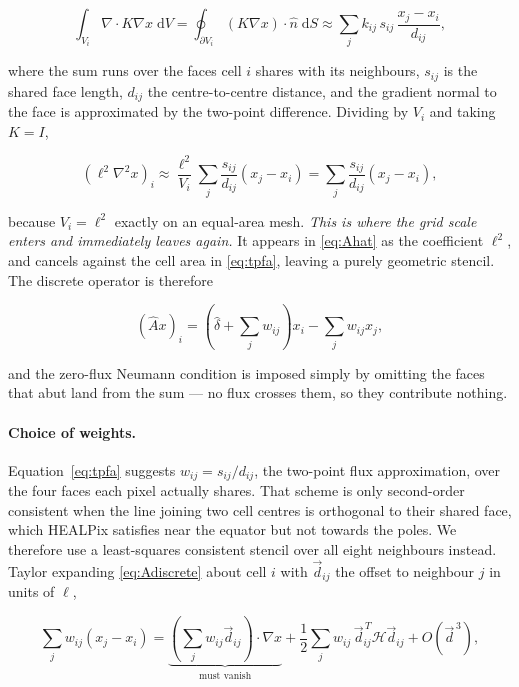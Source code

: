 \documentclass[11pt]{article}
\newcommand{\grid}{\ell}
\newcommand{\dhat}{\hat{\delta}}
\newcommand{\Ahat}{\hat{A}}
\begin{document}
\begin{equation}
\label{eq:fv}
\int_{V_i} \nabla\cdot K\nabla x \; \mathrm{d}V
 = \oint_{\partial V_i} \left(K\nabla x\right)\cdot \hat{n} \; \mathrm{d}S
 \approx \sum_{j} k_{ij}\, s_{ij} \, \frac{x_j - x_i}{d_{ij}},
\end{equation}

where the sum runs over the faces cell $i$ shares with its neighbours, $s_{ij}$ is the
shared face length, $d_{ij}$ the centre-to-centre distance, and the gradient normal to
the face is approximated by the two-point difference. Dividing by $V_i$ and taking
$K = I$,

\begin{equation}
\label{eq:tpfa}
\left(\grid^2 \nabla^2 x\right)_i
 \approx \frac{\grid^2}{V_i}\sum_j \frac{s_{ij}}{d_{ij}}\left(x_j - x_i\right)
 = \sum_j \frac{s_{ij}}{d_{ij}}\left(x_j - x_i\right),
\end{equation}

\noindent because $V_i = \grid^2$ exactly on an equal-area mesh. \emph{This is where the
grid scale enters and immediately leaves again.} It appears in \eqref{eq:Ahat} as the
coefficient $\grid^2$, and cancels against the cell area in \eqref{eq:tpfa}, leaving a
purely geometric stencil. The discrete operator is therefore

\begin{equation}
\label{eq:Adiscrete}
\left(\Ahat{}x\right)_i
 = \left(\dhat + \sum_j w_{ij}\right) x_i - \sum_j w_{ij} x_j ,
\end{equation}

and the zero-flux Neumann condition is imposed simply by omitting the faces that abut
land from the sum --- no flux crosses them, so they contribute nothing.

\paragraph{Choice of weights.} Equation~\eqref{eq:tpfa} suggests $w_{ij} = s_{ij}/d_{ij}$,
the two-point flux approximation, over the four faces each pixel actually shares. That
scheme is only second-order consistent when the line joining two cell centres is
orthogonal to their shared face, which HEALPix satisfies near the equator but not towards
the poles. We therefore use a least-squares consistent stencil over all eight neighbours
instead. Taylor expanding \eqref{eq:Adiscrete} about cell $i$ with
$\vec{d}_{ij}$ the offset to neighbour $j$ in units of $\grid$,

\begin{equation}
\sum_j w_{ij}\left(x_j - x_i\right)
 = \underbrace{\left(\sum_j w_{ij}\vec{d}_{ij}\right)\cdot\nabla x}_{\text{must vanish}}
 + \frac{1}{2}\sum_j w_{ij}\, \vec{d}_{ij}^{\,T} \mathcal{H} \vec{d}_{ij}
 + O(\vec{d}^{\,3}),
\end{equation}
\end{document}
